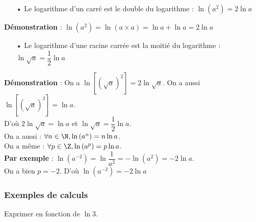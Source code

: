 \begin{itemize}
\item[•] Le logarithme d'un carré est le double du logarithme  : $\ln \left(a^2\right) = 2\ln a$ \\
\end{itemize}

\textbf{Démonstration} : $\ln\left(a^2\right) = \ln\left(a\times a\right) = \ln a + \ln a = 2\ln a$ \\

\begin{itemize}
\item[•] Le logarithme d'une racine carrée est la moitié du logarithme : $\ln \sqrt{a} = \dfrac{1}{2}\ln a$ \\
\end{itemize}

\textbf{Démonstration} : On a $\ln \left[\left(\sqrt{a}\right)^2\right] = 2\ln \sqrt{a}$. On a aussi $\ln \left[\left(\sqrt{a}\right)^2\right] = \ln a$. \\

D'où $2\ln \sqrt{a} = \ln a$ et $\ln \sqrt{a} = \dfrac{1}{2} \ln a$. \\

On a aussi : $\forall n \in \N, \ln \left(a^n\right) = n\ln a$. \\

On a même : $\forall p \in \Z, \ln \left(a^p\right) = p\ln a$. \\

\textbf{Par exemple} : $\ln \left(a^{-2}\right) = \ln \dfrac{1}{a^2} = -\ln\left(a^2\right) = -2\ln a$. \\

On a bien $p = -2$. D'où $\ln\left(a^{-2}\right) = -2\ln a$

\subsubsection{Exemples de calculs}

Exprimer en fonction de $\ln 3$.  \\

